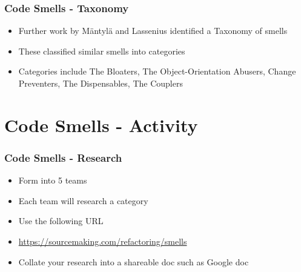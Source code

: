 \begin{frame}
\frametitle{Code Smells - Taxonomy}
\begin{itemize}
	\item Further work by M{\"a}ntyl{\"a} and Lassenius identified a Taxonomy of smells
	\item These classified similar smells into categories
	\item Categories include The Bloaters, The Object-Orientation Abusers, Change Preventers, The Dispensables, The Couplers 
\end{itemize}
\end{frame}

\section{Code Smells - Activity}

\begin{frame}
	\frametitle{Code Smells - Research}
	\begin{itemize}
		\item Form into 5 teams
		\item Each team will research a category
		\item Use the following URL
		\item \url{https://sourcemaking.com/refactoring/smells}
		\item Collate your research into a shareable doc such as Google doc
	\end{itemize}
\end{frame}


